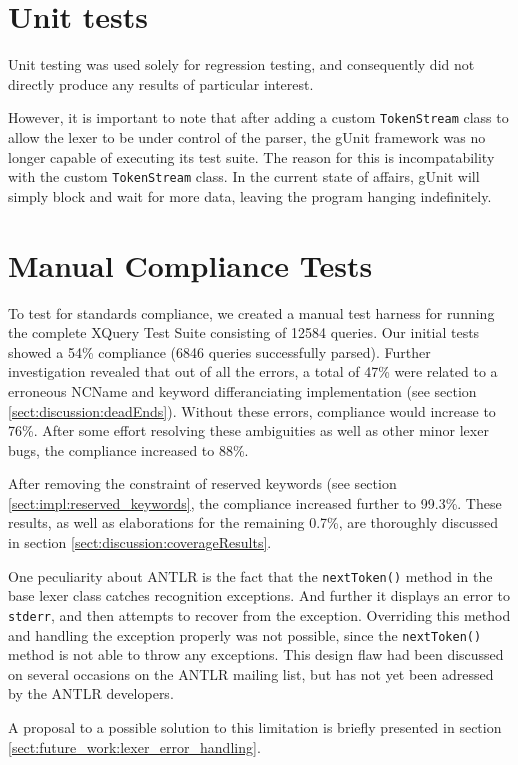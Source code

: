 \label{sect:results:tests}
\section{Unit tests}
\label{sect:results:tests:unit}
Unit testing was used solely for regression testing, and consequently did not directly 
produce any results of particular interest.

However, it is important to note that after adding a custom \verb!TokenStream! class to
allow the lexer to be under control of the parser, the gUnit framework was no
longer capable of executing its test suite. The reason for this is
incompatability with the custom \verb!TokenStream! class. In the current state of
affairs, gUnit will simply block and wait for more data, leaving the program
hanging indefinitely. 

\section{Manual Compliance Tests}
\label{sect:tests:manual}
To test for standards compliance, we created a manual test harness for running
the complete XQuery Test Suite\cite{w3c05} consisting of 12584 queries. Our
initial tests showed a 54\% compliance (6846 queries successfully parsed). Further
investigation revealed that out of all the errors, a total of 47\% were related
to a erroneous NCName and keyword differanciating implementation (see section
\ref{sect:discussion:deadEnds}). Without these errors, compliance would increase
to 76\%. After some effort resolving these ambiguities as well as other minor
lexer bugs, the compliance increased to 88\%.

After removing the constraint of reserved keywords (see section
\ref{sect:impl:reserved_keywords}, the compliance increased further to 99.3\%.
These results, as well as elaborations for the remaining 0.7\%, are thoroughly
discussed in section \ref{sect:discussion:coverageResults}.

One peculiarity about ANTLR is the fact that the \verb!nextToken()! method in
the base lexer class catches recognition exceptions. And further it displays an error to \verb!stderr!, and
then attempts to recover from the exception. Overriding this method and handling
the exception properly was not possible, since the \verb!nextToken()! method is not
able to throw any exceptions. This design flaw had been discussed on
several occasions on the ANTLR mailing list\cite{antlrmail}, but has not yet
been adressed by the ANTLR developers.

A proposal to a possible solution to this limitation is briefly presented in
section \ref{sect:future_work:lexer_error_handling}.